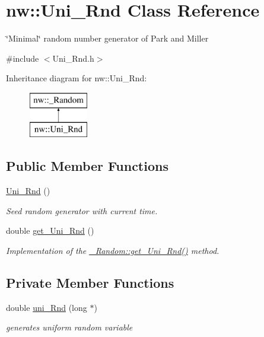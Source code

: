 \hypertarget{classnw_1_1_uni___rnd}{\section{nw\+:\+:Uni\+\_\+\+Rnd Class Reference}
\label{classnw_1_1_uni___rnd}
}


\char`\"{}\+Minimal\char`\"{} random number generator of Park and Miller  




{\ttfamily \#include $<$Uni\+\_\+\+Rnd.\+h$>$}

Inheritance diagram for nw\+:\+:Uni\+\_\+\+Rnd\+:\begin{figure}[H]
\begin{center}
\leavevmode
\includegraphics[height=2.000000cm]{d3/dc1/classnw_1_1_uni___rnd}
\end{center}
\end{figure}
\subsection*{Public Member Functions}
\begin{DoxyCompactItemize}
\item 
\hyperlink{classnw_1_1_uni___rnd_ac25386221e6f2da28eb74445c5378b6e}{Uni\+\_\+\+Rnd} ()
\begin{DoxyCompactList}\small\item\em Seed random generator with current time. \end{DoxyCompactList}\item 
double \hyperlink{classnw_1_1_uni___rnd_ad7883ef0ce4c591612bcb41678104773}{get\+\_\+\+Uni\+\_\+\+Rnd} ()
\begin{DoxyCompactList}\small\item\em Implementation of the \hyperlink{classnw_1_1___random_a943da227bd614e34718967a0521a51d1}{\+\_\+\+Random\+::get\+\_\+\+Uni\+\_\+\+Rnd()} method. \end{DoxyCompactList}\end{DoxyCompactItemize}
\subsection*{Private Member Functions}
\begin{DoxyCompactItemize}
\item 
double \hyperlink{classnw_1_1_uni___rnd_a1599d3ea8e72738bbfbad814e9e233ac}{uni\+\_\+\+Rnd} (long $\ast$)
\begin{DoxyCompactList}\small\item\em generates uniform random variable \end{DoxyCompactList}\end{DoxyCompactItemize}
